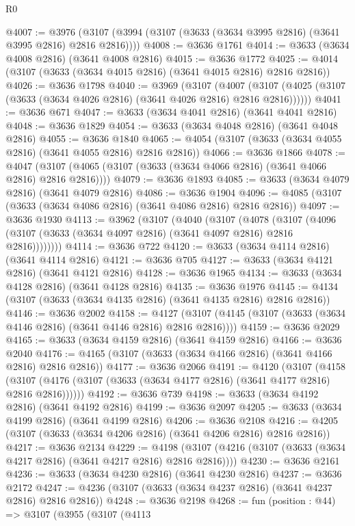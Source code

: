 \begin{lexlean}{R0}
\begin{coremodule}
@4007 := @3976 (@3107 (@3994 (@3107 (@3633 (@3634 @3995 @2816) (@3641 @3995 @2816) @2816 @2816))))
@4008 := @3636 @1761
@4014 := @3633 (@3634 @4008 @2816) (@3641 @4008 @2816)
@4015 := @3636 @1772
@4025 := @4014 (@3107 (@3633 (@3634 @4015 @2816) (@3641 @4015 @2816) @2816 @2816))
@4026 := @3636 @1798
@4040 := @3969
    (@3107
      (@4007 (@3107 (@4025 (@3107 (@3633 (@3634 @4026 @2816) (@3641 @4026 @2816) @2816 @2816))))))
@4041 := @3636 @671
@4047 := @3633 (@3634 @4041 @2816) (@3641 @4041 @2816)
@4048 := @3636 @1829
@4054 := @3633 (@3634 @4048 @2816) (@3641 @4048 @2816)
@4055 := @3636 @1840
@4065 := @4054 (@3107 (@3633 (@3634 @4055 @2816) (@3641 @4055 @2816) @2816 @2816))
@4066 := @3636 @1866
@4078 := @4047 (@3107 (@4065 (@3107 (@3633 (@3634 @4066 @2816) (@3641 @4066 @2816) @2816 @2816))))
@4079 := @3636 @1893
@4085 := @3633 (@3634 @4079 @2816) (@3641 @4079 @2816)
@4086 := @3636 @1904
@4096 := @4085 (@3107 (@3633 (@3634 @4086 @2816) (@3641 @4086 @2816) @2816 @2816))
@4097 := @3636 @1930
@4113 := @3962
    (@3107
      (@4040
        (@3107
          (@4078
            (@3107 (@4096 (@3107 (@3633 (@3634 @4097 @2816) (@3641 @4097 @2816) @2816 @2816))))))))
@4114 := @3636 @722
@4120 := @3633 (@3634 @4114 @2816) (@3641 @4114 @2816)
@4121 := @3636 @705
@4127 := @3633 (@3634 @4121 @2816) (@3641 @4121 @2816)
@4128 := @3636 @1965
@4134 := @3633 (@3634 @4128 @2816) (@3641 @4128 @2816)
@4135 := @3636 @1976
@4145 := @4134 (@3107 (@3633 (@3634 @4135 @2816) (@3641 @4135 @2816) @2816 @2816))
@4146 := @3636 @2002
@4158 := @4127 (@3107 (@4145 (@3107 (@3633 (@3634 @4146 @2816) (@3641 @4146 @2816) @2816 @2816))))
@4159 := @3636 @2029
@4165 := @3633 (@3634 @4159 @2816) (@3641 @4159 @2816)
@4166 := @3636 @2040
@4176 := @4165 (@3107 (@3633 (@3634 @4166 @2816) (@3641 @4166 @2816) @2816 @2816))
@4177 := @3636 @2066
@4191 := @4120
    (@3107
      (@4158 (@3107 (@4176 (@3107 (@3633 (@3634 @4177 @2816) (@3641 @4177 @2816) @2816 @2816))))))
@4192 := @3636 @739
@4198 := @3633 (@3634 @4192 @2816) (@3641 @4192 @2816)
@4199 := @3636 @2097
@4205 := @3633 (@3634 @4199 @2816) (@3641 @4199 @2816)
@4206 := @3636 @2108
@4216 := @4205 (@3107 (@3633 (@3634 @4206 @2816) (@3641 @4206 @2816) @2816 @2816))
@4217 := @3636 @2134
@4229 := @4198 (@3107 (@4216 (@3107 (@3633 (@3634 @4217 @2816) (@3641 @4217 @2816) @2816 @2816))))
@4230 := @3636 @2161
@4236 := @3633 (@3634 @4230 @2816) (@3641 @4230 @2816)
@4237 := @3636 @2172
@4247 := @4236 (@3107 (@3633 (@3634 @4237 @2816) (@3641 @4237 @2816) @2816 @2816))
@4248 := @3636 @2198
@4268 := fun (position : @44) =>
  @3107
    (@3955
      (@3107
        (@4113

\end{coremodule}
\end{lexlean}
